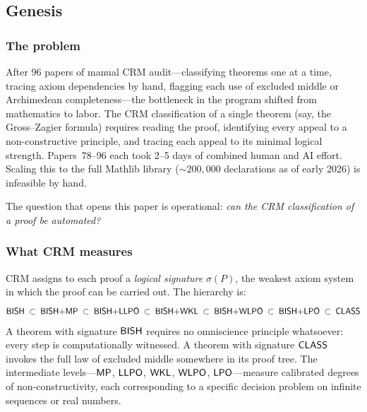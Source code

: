 
\subsection{Genesis}\label{part:genesis}

\subsubsection{The problem}\label{sec:problem}

After 96 papers of manual CRM audit---classifying theorems one at a time,
tracing axiom dependencies by hand, flagging each use of excluded middle
or Archimedean completeness---the bottleneck in the program shifted from
mathematics to labor.  The CRM classification of a single theorem
(say, the Gross--Zagier formula) requires reading the proof, identifying
every appeal to a non-constructive principle, and tracing each appeal
to its minimal logical strength.  Papers~78--96 each took 2--5 days of
combined human and AI effort.  Scaling this to the full Mathlib library
(${\sim}200{,}000$ declarations as of early 2026) is infeasible by hand.

The question that opens this paper is operational: \emph{can the CRM
classification of a proof be automated?}

\subsubsection{What CRM measures}\label{sec:what-crm-measures}

CRM assigns to each proof a \emph{logical signature} $\sigma(P)$, the
weakest axiom system in which the proof can be carried out.  The
hierarchy is:
\[
  \textsf{BISH} \;\subset\; \textsf{BISH}{+}\textsf{MP} \;\subset\; \textsf{BISH}{+}\textsf{LLPO}
  \;\subset\; \textsf{BISH}{+}\textsf{WKL} \;\subset\; \textsf{BISH}{+}\textsf{WLPO}
  \;\subset\; \textsf{BISH}{+}\textsf{LPO} \;\subset\; \textsf{CLASS}
\]
A theorem with signature $\textsf{BISH}$ requires no omniscience principle
whatsoever: every step is computationally witnessed.  A theorem with
signature $\textsf{CLASS}$ invokes the full law of excluded middle somewhere
in its proof tree.  The intermediate levels---$\textsf{MP}$, $\textsf{LLPO}$, $\textsf{WKL}$,
$\textsf{WLPO}$, $\textsf{LPO}$---measure calibrated degrees of non-constructivity,
each corresponding to a specific decision problem on infinite sequences
or real numbers.

